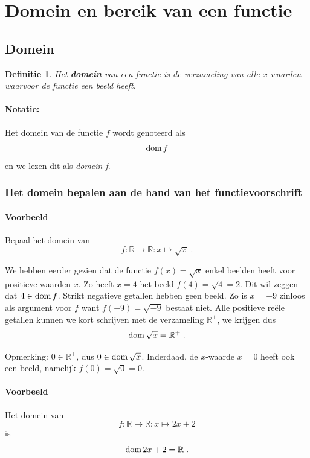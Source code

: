 \documentclass[12pt,twoside]{article}
\newtheorem{definition}{Definitie}
\begin{document}
\newpage
\section{Domein en bereik van een functie}

\subsection{Domein}

\begin{definition}
Het {\bf domein} van een functie is de verzameling van alle $x$-waarden waarvoor de functie een beeld heeft.
\end{definition}

\paragraph{Notatie:} Het domein van de functie $f$ wordt genoteerd als $$\dom f$$ en we lezen dit als {\em domein f}.

\subsubsection{Het domein bepalen aan de hand van het functievoorschrift}

\paragraph{Voorbeeld} Bepaal het domein van $$f:\mathbb{R}\to\mathbb{R}:x\mapsto \sqrt{x}\;.$$

We hebben eerder gezien dat de functie $f(x)=\sqrt{x}$ enkel beelden heeft voor positieve waarden $x$. Zo heeft $x=4$ het beeld $f(4)=\sqrt{4}=2$. Dit wil zeggen dat $4\in\dom f$. Strikt negatieve getallen hebben geen beeld. Zo is $x=-9$ zinloos als argument voor $f$ want $f(-9)=\sqrt{-9}$ bestaat niet. Alle positieve reële getallen kunnen we kort schrijven met de verzameling $\mathbb{R}^+$, we krijgen dus
$$\dom \sqrt{x}= \mathbb{R}^+\;.$$

Opmerking: $0\in\mathbb{R}^+$, dus $0\in\dom\sqrt{x}$. Inderdaad, de $x$-waarde $x=0$ heeft ook een beeld, namelijk $f(0)=\sqrt{0}=0$.

\paragraph{Voorbeeld}
Het domein van
$$f:\mathbb{R}\to\mathbb{R}:x\mapsto 2x+2$$
is
$$\dom 2x+2 = \mathbb{R}\;.$$
\end{document}
